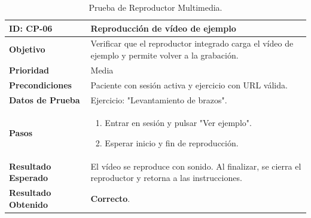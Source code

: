 \begin{table}[H]
    \centering
    \begin{tabularx}{\textwidth}{|l|X|}
        \hline
        \rowcolor{gray!25} \textbf{ID: CP-06} & \textbf{Reproducción de vídeo de ejemplo} \\ \hline
        \textbf{Objetivo} & Verificar que el reproductor integrado carga el vídeo de ejemplo y permite volver a la grabación. \\ \hline
        \textbf{Prioridad} & Media \\ \hline
        \textbf{Precondiciones} & Paciente con sesión activa y ejercicio con URL válida. \\ \hline
        \textbf{Datos de Prueba} & Ejercicio: "Levantamiento de brazos". \\ \hline
        \textbf{Pasos} & 
        \vspace*{-\baselineskip}
        \begin{enumerate}
            \item Entrar en sesión y pulsar "Ver ejemplo".
            \item Esperar inicio y fin de reproducción.
        \end{enumerate} \\ \hline
        \textbf{Resultado Esperado} & El vídeo se reproduce con sonido. Al finalizar, se cierra el reproductor y retorna a las instrucciones. \\ \hline
        \textbf{Resultado Obtenido} & \textcolor{green!40!black}{\textbf{Correcto}}. \\ \hline
    \end{tabularx}
    \caption{Prueba de Reproductor Multimedia.}
\end{table}

